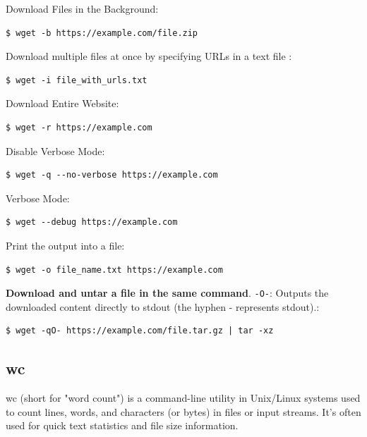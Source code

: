 \documentclass{article}
\newenvironment{codetemplate}[1][]{%
  \mybasecolorbox[#1]
  \itshape
}{%
  \endmybasecolorbox
}
\begin{document}
Download Files in the Background:
\begin{codetemplate}{}
\begin{verbatim}
$ wget -b https://example.com/file.zip
\end{verbatim}
\end{codetemplate}

Download multiple files at once by specifying URLs in a text file :
\begin{codetemplate}{}
\begin{verbatim}
$ wget -i file_with_urls.txt
\end{verbatim}
\end{codetemplate}

Download Entire Website:
\begin{codetemplate}{}
\begin{verbatim}
$ wget -r https://example.com
\end{verbatim}
\end{codetemplate}

Disable Verbose Mode:
\begin{codetemplate}{}
\begin{verbatim}
$ wget -q --no-verbose https://example.com
\end{verbatim}
\end{codetemplate}

Verbose Mode:
\begin{codetemplate}{}
\begin{verbatim}
$ wget --debug https://example.com
\end{verbatim}
\end{codetemplate}

Print the output into a file:
\begin{codetemplate}{}
\begin{verbatim}
$ wget -o file_name.txt https://example.com
\end{verbatim}
\end{codetemplate}

\textbf{Download and untar a file in the same command}. \verb|-O-|: Outputs the downloaded content directly to stdout (the hyphen - represents stdout).:
\begin{codetemplate}{}
\begin{verbatim}
$ wget -qO- https://example.com/file.tar.gz | tar -xz
\end{verbatim}
\end{codetemplate}

\subsection{wc}
wc (short for "word count") is a command-line utility in Unix/Linux systems used to count lines, words, and characters (or bytes) in files or input streams. It's often used for quick text statistics and file size information.
\end{document}

